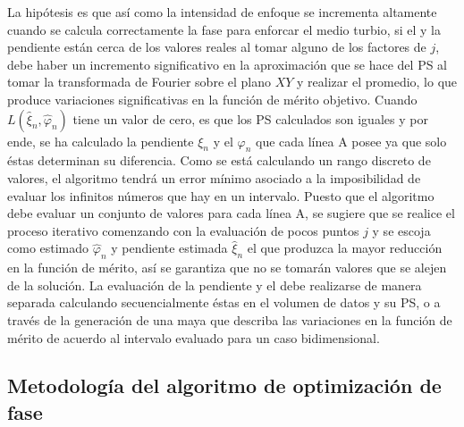 La hipótesis es que así como la intensidad de enfoque se incrementa altamente cuando se calcula correctamente la fase para enforcar el medio turbio, si el \offset y la pendiente están cerca de los valores reales al tomar alguno de los factores de $j$, debe haber un incremento significativo en la aproximación que se hace del PS al tomar la transformada de Fourier sobre el plano $XY$ y realizar el promedio, lo que produce variaciones significativas en la función de mérito objetivo. Cuando $L(\hat{\xi}_n,\hat{\varphi}_n)$ tiene un valor de cero, es que los PS calculados son iguales y por ende, se ha calculado la pendiente $\xi_n$ y el \offset $\varphi_n$ que cada línea A posee ya que solo éstas determinan su diferencia. Como se está calculando un rango discreto de valores, el algoritmo tendrá un error mínimo asociado a la imposibilidad de evaluar los infinitos números que hay en un intervalo. Puesto que el algoritmo debe evaluar un conjunto de valores para cada línea A, se sugiere que se realice el proceso iterativo comenzando con la evaluación de pocos puntos $j$ y se escoja como \offset estimado $\hat{\varphi}_n$ y pendiente estimada $\hat{\xi}_n$ el que produzca la mayor reducción en la función de mérito, así se garantiza que no se tomarán valores que se alejen de la solución. La evaluación de la pendiente y el \offset debe realizarse de manera separada calculando secuencialmente éstas en el volumen de datos y su PS, o a través de la generación de una maya que describa las variaciones en la función de mérito de acuerdo al intervalo evaluado para un caso bidimensional.


\subsection{Metodología del algoritmo de optimización de fase}

